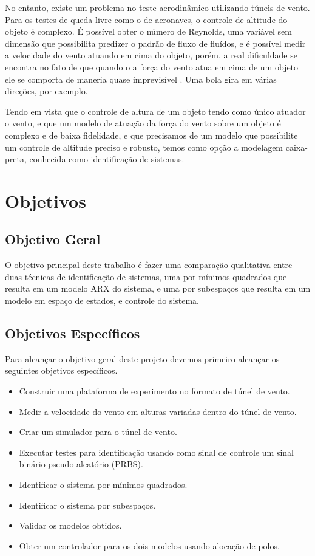 No entanto, existe um problema no teste aerodinâmico utilizando túneis de vento. Para os testes de queda livre como o de aeronaves, o controle de altitude do objeto é complexo. É possível obter o número de Reynolds, uma variável sem dimensão que possibilita predizer o padrão de fluxo de fluídos, e é possível medir a velocidade do vento atuando em cima do objeto, porém, a real dificuldade se encontra no fato de que quando o a força do vento atua em cima de um objeto ele se comporta de maneria quase imprevisível  . Uma bola gira em várias direções, por exemplo.


Tendo em vista que o controle de altura de um objeto tendo como único atuador o vento, e que um modelo de atuação da força do vento sobre um objeto é complexo e de baixa fidelidade, e que precisamos de um modelo que possibilite um controle de altitude preciso e robusto, temos como opção a modelagem caixa-preta, conhecida como identificação de sistemas.


\section{Objetivos}

\subsection{Objetivo Geral}


O objetivo principal deste trabalho é fazer uma comparação qualitativa entre duas técnicas de identificação de sistemas, uma por mínimos quadrados que resulta em um modelo ARX do sistema, e uma por subespaços que resulta em um modelo em espaço de estados, e controle do sistema.

\subsection{Objetivos Específicos}

Para alcançar o objetivo geral deste projeto devemos primeiro alcançar os seguintes objetivos específicos.

\begin{itemize}
	\item Construir uma plataforma de experimento no formato de túnel de vento.
	\item Medir a velocidade do vento em alturas variadas dentro do túnel de vento.
	\item Criar um simulador para o túnel de vento.
	\item Executar testes para identificação usando como sinal de controle um sinal binário pseudo aleatório (PRBS).
	\item Identificar o sistema por mínimos quadrados.
	\item Identificar o sistema por subespaços.
	\item Validar os modelos obtidos.
	\item Obter um controlador para os dois modelos usando alocação de polos.
\end{itemize}

